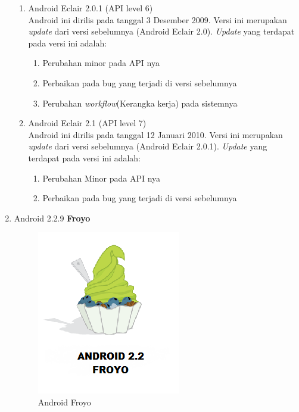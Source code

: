 \begin{enumerate}
\begin{enumerate}
    \item Android Eclair 2.0.1 (API level 6)\\
    Android ini dirilis pada tanggal 3 Desember 2009. Versi ini merupakan \textit{update} dari versi sebelumnya (Android Eclair 2.0). \textit{Update} yang terdapat pada versi ini adalah:
    \begin{enumerate}
        \item Perubahan minor pada API nya
        \item Perbaikan pada bug yang terjadi di versi sebelumnya
        \item Perubahan \textit{workflow}(Kerangka kerja) pada sistemnya
    \end{enumerate}

    \item Android Eclair 2.1 (API level 7)\\
    Android ini dirilis pada tanggal 12 Januari 2010. Versi ini merupakan \textit{update} dari versi sebelumnya (Android Eclair 2.0.1). \textit{Update} yang terdapat pada versi ini adalah:
    \begin{enumerate}
        \item Perubahan Minor pada API nya
        \item Perbaikan pada bug yang terjadi di versi sebelumnya\\
    \end{enumerate}
\end{enumerate}

\item Android 2.2.9 \textbf{Froyo}\\
\begin{figure}[!htbp]
    \centering
    \includegraphics[scale = 0.45]{pictures/android-froyo.png}
    \caption{Android Froyo}
    \label{}
\end{figure}


\end{enumerate}

